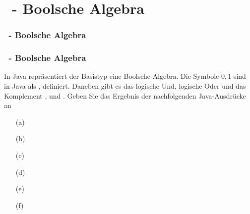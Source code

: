 \def\stitle{\theexercise\ - Boolsche Algebra}
\section{\stitle}
\begin{frame}
    \frametitle{\stitle}%
\tableofcontents[current]
\end{frame}

\begin{frame}[t]
  \frametitle{\stitle}


In Java repräsentiert der Basistyp  eine Boolsche Algebra.
Die Symbole $0, 1$ sind in Java als ,  definiert.
Daneben gibt es das logische Und, logische Oder und das Komplement \code{\&\&}, \code{||} und \code{!}.
Geben Sie das Ergebnis der nachfolgenden Java-Ausdrücke an
\medskip

\begin{minipage}{0.49\textwidth}
\begin{itemize}
\item[(a)] 
\item[(b)] 
\item[(c)] 
\end{itemize}
\end{minipage}
\begin{minipage}{0.49\textwidth}
\begin{itemize}
\item[(d)] 
\item[(e)] 
\item[(f)] 
\end{itemize}
\end{minipage}
\end{frame}

